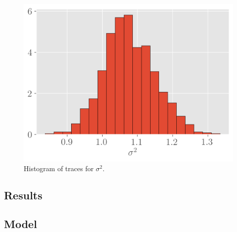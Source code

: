 \documentclass[12pt]{article}
\begin{document}
\begin{figure}[!h]
    \centering
    \includegraphics[scale=.5
    ]{../figures/sigma.png}
    \caption{Histogram of traces for $\sigma^2$.}
    \label{sig}
\end{figure}

\subsection{Results}

\subsection{Model}


\newpage
 

\end{document}
